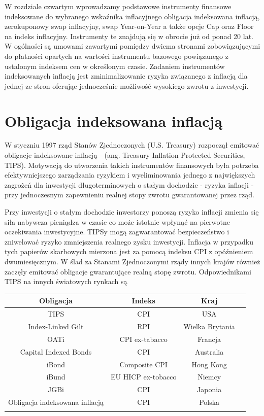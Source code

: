 \documentclass{mini}
\theoremstyle{mythstyle}
\begin{document}
	W rozdziale czwartym wprowadzamy podstawowe instrumenty finansowe indeksowane do wybranego wskaźnika inflacyjnego obligacja indeksowana inflacją, zerokuponowy swap inflacyjny, swap Year-on-Year a także opcje Cap oraz Floor na indeks inflacyjny. Instrumenty te znajdują się w obrocie już od ponad 20 lat. W ogólności są umowami zawartymi pomiędzy dwiema stronami zobowiązującymi do płatności opartych na wartości instrumentu bazowego powiązanego z ustalonym indeksem cen w określonym czasie. Zadaniem instrumentów indeksowanych inflacją jest zminimalizowanie ryzyka związanego z inflacją dla jednej ze stron oferując jednocześnie możliwość wysokiego zwrotu z inwestycji.
	
	\section{Obligacja indeksowana inflacją}
	
	W styczniu 1997 rząd Stanów Zjednoczonych (U.S. Treasury) rozpoczął emitować obligacje indeksowane inflacją - (ang. Treasury Inflation Protected Securities, TIPS). Motywacją do utworzenia takich instrumentów finansowych była potrzeba efektywniejszego zarządzania ryzykiem i wyeliminowania jednego z największych zagrożeń dla inwestycji długoterminowych o stałym dochodzie - ryzyka inflacji - przy jednoczesnym zapewnieniu realnej stopy zwrotu gwarantowanej przez rząd. 
	
	Przy inwestycji o stałym dochodzie inwestorzy ponoszą ryzyko inflacji zmienia się siła nabywcza pieniądza w czasie co może istotnie wpłynąć na pierwotne oczekiwania inwestycyjne. TIPSy mogą zagwarantować bezpieczeństwo i zniwelować ryzyko zmniejszenia realnego zysku inwestycji. Inflacja w przypadku tych papierów skarbowych mierzona jest za pomocą indeksu CPI z opóźnieniem dwumiesięcznym. W ślad za Stanami Zjednoczonymi rządy innych krajów również zaczęły emitować obligacje gwarantujące realną stopę zwrotu. Odpowiednikami TIPS na innych światowych rynkach są
	
	\begin{center}
	\begin{tabular}{c c c c}
		\textbf{Obligacja} & \textbf{Indeks} & \textbf{Kraj}  \\ \hline
		TIPS & CPI & USA  \\
		Index-Linked Gilt  & RPI & Wielka Brytania \\
		OATi & CPI ex-tabacco & Francja   \\
		Capital Indexed Bonds & CPI & Australia   \\
		iBond & Composite CPI& Hong Kong   \\
		iBund & EU HICP ex-tobacco & Niemcy  \\
		JGBi & CPI & Japonia \\
		Obligacja indeksowana inflacją & CPI & Polska\\ \\
   
	\end{tabular}
\end{center}
\end{document}
